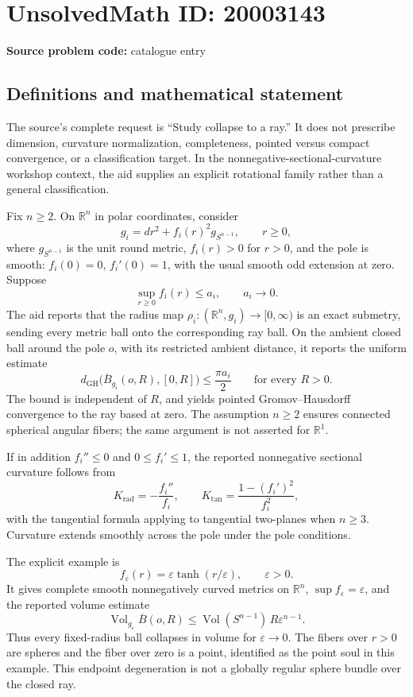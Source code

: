 \documentclass[11pt]{article}
\newcommand{\R}{\mathbb{R}}
\begin{document}
\section*{UnsolvedMath ID: 20003143}
\textbf{Source problem code:} catalogue entry
\subsection{Definitions and mathematical statement}
The source's complete request is ``Study collapse to a ray.'' It does not prescribe dimension, curvature normalization, completeness, pointed versus compact convergence, or a classification target. In the nonnegative-sectional-curvature workshop context, the aid supplies an explicit rotational family rather than a general classification.

Fix $n\geq2$. On $\R^n$ in polar coordinates, consider
\[
 g_i=dr^2+f_i(r)^2g_{S^{n-1}},\qquad r\geq0,
\]
where $g_{S^{n-1}}$ is the unit round metric, $f_i(r)>0$ for $r>0$, and the pole is smooth: $f_i(0)=0$, $f_i'(0)=1$, with the usual smooth odd extension at zero. Suppose
\[
 \sup_{r\geq0}f_i(r)\leq a_i,\qquad a_i\longrightarrow0.
\]
The aid reports that the radius map $\rho_i:(\R^n,g_i)\to[0,\infty)$ is an exact submetry, sending every metric ball onto the corresponding ray ball. On the ambient closed ball around the pole $o$, with its restricted ambient distance, it reports the uniform estimate
\[
 d_{\mathrm{GH}}\bigl(\overline B_{g_i}(o,R),[0,R]\bigr)
 \leq\frac{\pi a_i}{2}\qquad\text{for every }R>0.
\]
The bound is independent of $R$, and yields pointed Gromov--Hausdorff convergence to the ray based at zero. The assumption $n\geq2$ ensures connected spherical angular fibers; the same argument is not asserted for $\R^1$.

If in addition $f_i''\leq0$ and $0\leq f_i'\leq1$, the reported nonnegative sectional curvature follows from
\[
 K_{\mathrm{rad}}=-\frac{f_i''}{f_i},\qquad
 K_{\mathrm{tan}}=\frac{1-(f_i')^2}{f_i^2},
\]
with the tangential formula applying to tangential two-planes when $n\geq3$. Curvature extends smoothly across the pole under the pole conditions.

The explicit example is
\[
 f_\varepsilon(r)=\varepsilon\tanh(r/\varepsilon),\qquad\varepsilon>0.
\]
It gives complete smooth nonnegatively curved metrics on $\R^n$, $\sup f_\varepsilon=\varepsilon$, and the reported volume estimate
\[
 \operatorname{Vol}_{g_\varepsilon}\overline B(o,R)
 \leq\operatorname{Vol}(S^{n-1})\,R\varepsilon^{n-1}.
\]
Thus every fixed-radius ball collapses in volume for $\varepsilon\to0$. The fibers over $r>0$ are spheres and the fiber over zero is a point, identified as the point soul in this example. This endpoint degeneration is not a globally regular sphere bundle over the closed ray.
\end{document}
